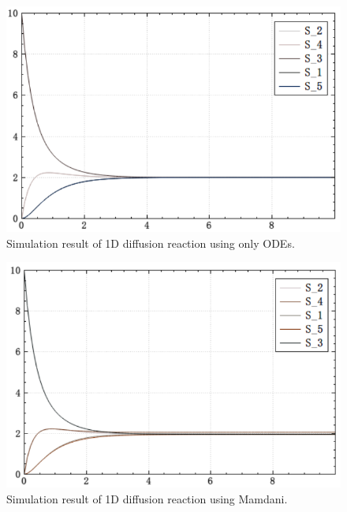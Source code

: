 \documentclass[journal,a4paper,onecolumn]{article}
\begin{document}
\begin{figure}[!hbt]
	\begin{center}
		\includegraphics[width=\columnwidth]{fig21}
		\caption{Simulation result of 1D diffusion reaction using only ODEs.}
		\label{fig:Simulation result of 1D diffusion reaction using only ODEs.}
	\end{center}
\end{figure}
\begin{figure}[!hbt]
	\begin{center}
		\includegraphics[width=\columnwidth]{fig22}
		\caption{Simulation result of 1D diffusion reaction using Mamdani.}
		\label{fig:Simulation result of 1D diffusion reaction using Mamdani.}
	\end{center}
\end{figure}
\end{document}
